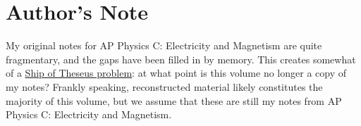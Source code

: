\documentclass[a4paper, titlepage]{book}
\begin{document}
\frontmatter

\tableofcontents \label{contents}

\chapter{Author's Note}

My original notes for AP Physics C: Electricity and Magnetism
are quite fragmentary, and the gaps have been filled in by memory.
This creates somewhat of a
\href{https://en.wikipedia.org/wiki/Ship_of_Theseus}{Ship of Theseus problem}:
at what point is this volume no longer a copy of my notes?
Frankly speaking,
reconstructed material likely constitutes the majority of this volume,
but we assume that these are still my notes
from AP Physics C: Electricity and Magnetism.

\mainmatter








\appendix



\backmatter

\printbibliography[
    heading=bibintoc,
    title={References},
]
\end{document}
